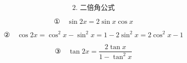 \[
	\text{2. 二倍角公式}
\]

\[
	\text{①}\quad \sin 2x = 2\sin x\cos x
\]

\[
	\text{②}\quad \cos 2x
	= \cos^2 x-\sin^2 x
	= 1-2\sin^2 x
	= 2\cos^2 x-1
\]

\[
	\text{③}\quad \tan 2x
	= \frac{2\tan x}{1-\tan^2 x}
\]